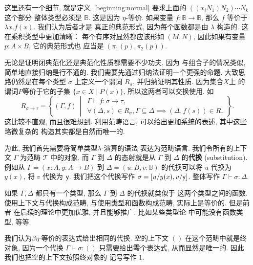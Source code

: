 这里还有一个细节, 就是定义~\ref{beginning:normal}
要求上面的 \(((x_iN_1)N_2) \cdots N_k\) 这个部分
整体类型必须是 \(\mathbb B\). 这是因为 \(\eta\)-等价.
如果变量 \(f : \mathbb B \to \mathbb B\), 那么
\(f\) 等价于 \(\lambda x. f(x)\). 我们认为后者才是
真正的典范形式, 因为每个函数都是由 \(\lambda\) 构造的.
这在乘积类型中更加清晰： 每个有序对显然都应该形如 \((M, N)\),
因此如果有变量 \(p : A \times B\), 它的典范形式也
应当是 \((\pi_1(p), \pi_2(p))\).

无论是证明闭典范化还是典范化性质都需要不少功夫, 因为
与组合子的情况类似, 简单地直接归纳是行不通的.
我们需要先通过归纳法证明一个更强的命题.
大致思路仍然是在每个类型 \(\sigma\) 上定义一个谓词
\(R_\sigma\), 并归纳证明其性质. 因为集合\(X\)上
的谓词\(P\)等价于它的子集 \(\{x\in X\mid P(x)\}\),
所以这两者可以交换使用. 如
\[R_{\sigma \to \tau} = \left\{(\Gamma, f) \,\middle|\,
\begin{matrix}
\Gamma \vdash f:\sigma\to\tau, \\
\forall (\Delta, s) \in R_\sigma,
\Gamma \subseteq \Delta \implies
(\Delta, f(s)) \in R_\tau
\end{matrix}
\right\}.\]
这比较不直观, 而且很难想到.
利用范畴语言, 可以给出更加系统的表述, 其中这些略微复杂的
构造其实都是自然而唯一的.

为此, 我们首先需要将简单类型\(\lambda\)-演算的语法
表达为范畴语言. 我们令所有的上下文 \(\Gamma\) 为范畴
\(\mathcal T\) 中的对象, 而 \(\Gamma\) 到 \(\Delta\)
的态射就是从 \(\Gamma\) 到 \(\Delta\)
的\textbf{代换} (substitution). 例如从
\(\Gamma = (x{:}A, y{:}A \to B)\) 到
\(\Delta = (u{:}B, v{:}\mathbb B)\) 的代换可以将
\(u\) 代换为 \(y(x)\), 将 \(v\) 代换为 \(\textsf{y}\).
我们把这个代换写作 \(\sigma = [u/y(x), v/\textsf{y}]\).
整体写作 \(\Gamma \vdash \sigma : \Delta\).

如果 \(\Gamma, \Delta\) 都只有一个类型,
那么 \(\Gamma\) 到 \(\Delta\) 的代换就类似于
这两个类型之间的函数. 使用上下文与代换构成范畴,
与使用类型和函数构成范畴, 实际上是等价的. 但是前者
在后续的理论中更加优雅, 并且能够推广. 比如某些类型论
中可能没有函数类型, 等等.

我们认为\(\beta\eta\)-等价的表达式给出相同的代换.
空的上下文 \(()\) 在这个范畴中就是终对象, 因为一个代换
\(\Gamma \vdash \sigma : ()\) 只需要给出零个表达式,
从而显然是唯一的. 因此我们也把空的上下文按照终对象的
记号写作 \(1\).

